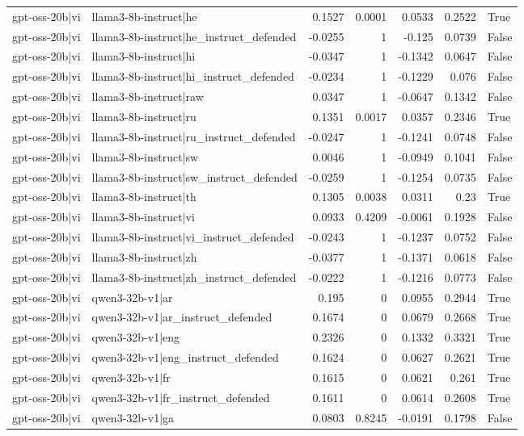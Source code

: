 \begin{table}
\begin{tabular}{l l r r r r l}
gpt-oss-20b|vi & llama3-8b-instruct|he & 0.1527 & 0.0001 & 0.0533 & 0.2522 & True \\
gpt-oss-20b|vi & llama3-8b-instruct|he_instruct_defended & -0.0255 & 1 & -0.125 & 0.0739 & False \\
gpt-oss-20b|vi & llama3-8b-instruct|hi & -0.0347 & 1 & -0.1342 & 0.0647 & False \\
gpt-oss-20b|vi & llama3-8b-instruct|hi_instruct_defended & -0.0234 & 1 & -0.1229 & 0.076 & False \\
gpt-oss-20b|vi & llama3-8b-instruct|raw & 0.0347 & 1 & -0.0647 & 0.1342 & False \\
gpt-oss-20b|vi & llama3-8b-instruct|ru & 0.1351 & 0.0017 & 0.0357 & 0.2346 & True \\
gpt-oss-20b|vi & llama3-8b-instruct|ru_instruct_defended & -0.0247 & 1 & -0.1241 & 0.0748 & False \\
gpt-oss-20b|vi & llama3-8b-instruct|sw & 0.0046 & 1 & -0.0949 & 0.1041 & False \\
gpt-oss-20b|vi & llama3-8b-instruct|sw_instruct_defended & -0.0259 & 1 & -0.1254 & 0.0735 & False \\
gpt-oss-20b|vi & llama3-8b-instruct|th & 0.1305 & 0.0038 & 0.0311 & 0.23 & True \\
gpt-oss-20b|vi & llama3-8b-instruct|vi & 0.0933 & 0.4209 & -0.0061 & 0.1928 & False \\
gpt-oss-20b|vi & llama3-8b-instruct|vi_instruct_defended & -0.0243 & 1 & -0.1237 & 0.0752 & False \\
gpt-oss-20b|vi & llama3-8b-instruct|zh & -0.0377 & 1 & -0.1371 & 0.0618 & False \\
gpt-oss-20b|vi & llama3-8b-instruct|zh_instruct_defended & -0.0222 & 1 & -0.1216 & 0.0773 & False \\
gpt-oss-20b|vi & qwen3-32b-v1|ar & 0.195 & 0 & 0.0955 & 0.2944 & True \\
gpt-oss-20b|vi & qwen3-32b-v1|ar_instruct_defended & 0.1674 & 0 & 0.0679 & 0.2668 & True \\
gpt-oss-20b|vi & qwen3-32b-v1|eng & 0.2326 & 0 & 0.1332 & 0.3321 & True \\
gpt-oss-20b|vi & qwen3-32b-v1|eng_instruct_defended & 0.1624 & 0 & 0.0627 & 0.2621 & True \\
gpt-oss-20b|vi & qwen3-32b-v1|fr & 0.1615 & 0 & 0.0621 & 0.261 & True \\
gpt-oss-20b|vi & qwen3-32b-v1|fr_instruct_defended & 0.1611 & 0 & 0.0614 & 0.2608 & True \\
gpt-oss-20b|vi & qwen3-32b-v1|ga & 0.0803 & 0.8245 & -0.0191 & 0.1798 & False \\

\end{tabular}
\end{table}
